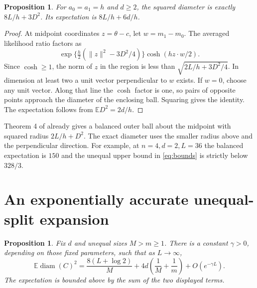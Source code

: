 \documentclass[11pt,a4paper]{amsart}
\newtheorem{proposition}[theorem]{Proposition}
\begin{document}
\begin{proposition}\label{prop:balanced}
For \(a_0=a_1=h\) and \(d\ge2\), the squared diameter is exactly \(8L/h+3D^2\). Its expectation is \(8L/h+6d/h\).
\end{proposition}

\begin{proof}
At midpoint coordinates \(z=\theta-c\), let \(w=m_1-m_0\). The averaged likelihood ratio factors as
\[
 \exp\{\tfrac h2(\|z\|^2-3D^2/4)\}\cosh(hz\cdot w/2).
\]
Since \(\cosh\ge1\), the norm of \(z\) in the region is less than \(\sqrt{2L/h+3D^2/4}\). In dimension at least two a unit vector perpendicular to \(w\) exists. If \(w=0\), choose any unit vector. Along that line the \(\cosh\) factor is one, so pairs of opposite points approach the diameter of the enclosing ball. Squaring gives the identity. The expectation follows from \(\mathbb E D^2=2d/h\).
\end{proof}

Theorem 4 of \cite{drbw} already gives a balanced outer ball about the midpoint with squared radius \(2L/h+D^2\). The exact diameter uses the smaller radius above and the perpendicular direction. For example, at \(n=4,d=2,L=36\) the balanced expectation is \(150\) and the unequal upper bound in \eqref{eq:bounds} is strictly below \(328/3\).

\section{An exponentially accurate unequal-split expansion}

\begin{proposition}\label{prop:expansion}
Fix \(d\) and unequal sizes \(M>m\ge1\). There is a constant \(\gamma>0\), depending on those fixed parameters, such that as \(L\to\infty\),
\[
 \mathbb E\operatorname{diam}(C)^2
 =\frac{8(L+\log 2)}{M}+4d\left(\frac1M+\frac1m\right)+O(e^{-\gamma L}).
\]
The expectation is bounded above by the sum of the two displayed terms.
\end{proposition}
\end{document}
